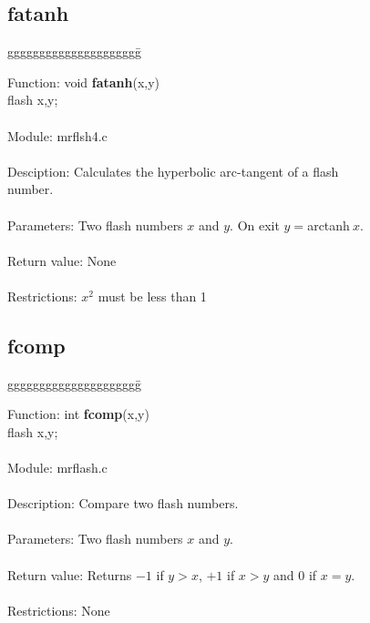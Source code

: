 \subsection{fatanh}

\begin{tabbing}
ggggggggggggggggggggg\= \kill

      Function:      \>void {\bf fatanh}(x,y) \\
                     \>flash x,y; \\
      \ \\
      Module:        \>mrflsh4.c \\
      \ \\
      Desciption:    \>Calculates the hyperbolic arc-tangent of a flash \\
                     \>number. \\
      \ \\
      Parameters:    \>Two flash numbers $x$ and $y$. On exit $y=$arctanh$\ x$. \\
      \ \\
      Return value:  \>None \\
      \ \\
      Restrictions:  \>$x^2$  must be less than 1   \\
      
\end{tabbing}

\subsection{fcomp}

\begin{tabbing}
ggggggggggggggggggggg\= \kill


      Function:      \>int {\bf fcomp}(x,y) \\
                     \>flash x,y; \\
      \ \\
      Module:        \>mrflash.c \\
      \ \\
      Description:   \>Compare two flash numbers. \\
      \ \\
      Parameters:    \>Two flash numbers $x$ and $y$. \\
      \ \\
      Return value:  \>Returns $-1$ if $y>x$, $+1$ if $x>y$ and 0 if $x=y$. \\
      \ \\
      Restrictions:  \>None \\
      
\end{tabbing}
\pagebreak
